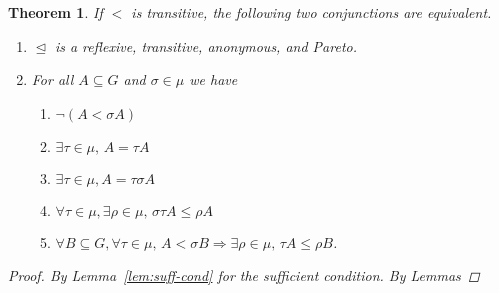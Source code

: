 \documentclass[11pt]{article}
\newtheorem{theorem}[definition]{Theorem}
\newcommand{\releq}{\mathrel{\trianglelefteq}}
\begin{document}
\begin{theorem}
If $<$ is transitive, the following two conjunctions are equivalent.

\begin{enumerate}
 \item $\releq$ is a reflexive, transitive, anonymous, and Pareto.
 
 \item For all $A \subseteq G$ and $\sigma \in \mu$ we have
 
 \begin{enumerate}
  \item $\neg(A < \sigma A)$
 
 \item $\exists \tau \in \mu,\, A = \tau A$
 
 \item $\exists \tau \in \mu, A = \tau \sigma A$
 
 
 \item $\forall \tau \in \mu,\exists \rho \in \mu,\, \sigma \tau A \leq \rho A$
 
 \item $\forall B \subseteq G, \forall \tau \in \mu,\, A < \sigma B \Rightarrow \exists \rho \in \mu,\, \tau A \leq \rho B$.
\end{enumerate}
\end{enumerate}

 \begin{proof}
 By Lemma~\ref{lem:suff-cond} for the sufficient condition. By Lemmas  
 \end{proof}

 
 
\end{theorem}
\end{document}
